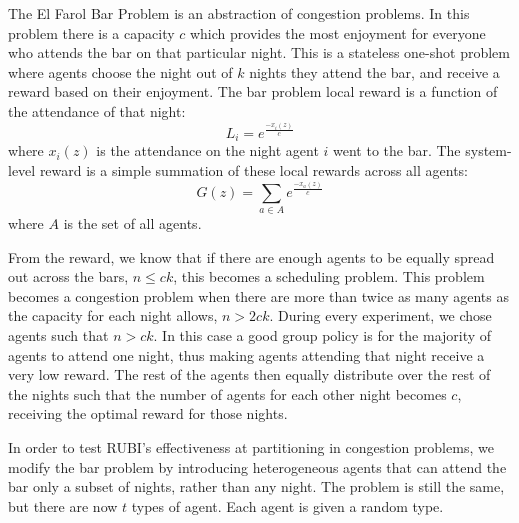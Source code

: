 \documentclass[smallcondensed]{svjour3}
\begin{document}
The El Farol Bar Problem \cite{BarProblem} is an abstraction of congestion problems. In this problem there is a capacity $c$ which provides the most enjoyment for everyone who attends the bar on that particular night. This is a stateless one-shot problem where agents choose the night out of $k$ nights they attend the bar, and receive a reward based on their enjoyment. The bar problem local reward is a function of the attendance of that night:
%
\begin{equation} \label{eq:BarProblem-Local}
L_i = e^{\frac{-x_i(z)}{c}}
\end{equation}
%
where $x_i(z)$ is the attendance on the night agent $i$ went to the bar. The system-level reward is a simple summation of these local rewards across all agents:
%
\begin{equation} \label{eq:BarProblem-Global}
G(z) = \sum_{a \in A} e^{\frac{-x_a(z)}{c}}
\end{equation}
%
where $A$ is the set of all agents. 

From the reward, we know that if there are enough agents to be equally spread out across the bars, $n \leq ck$, this becomes a scheduling problem. This problem becomes a congestion problem when there are more than twice as many agents as the capacity for each night allows, $n > 2ck$. During every experiment, we chose agents such that $n > ck$. In this case a good group policy is for the majority of agents to attend one night, thus making agents attending that night receive a very low reward. The rest of the agents then equally distribute over the rest of the nights such that the number of agents for each other night becomes $c$, receiving the optimal reward for those nights. 


In order to test RUBI's effectiveness at partitioning in congestion problems, we modify the bar problem by introducing heterogeneous agents that can attend the bar only a subset of nights, rather than any night. The problem is still the same, but there are now $t$ types of agent. Each agent is given a random type.
\end{document}
